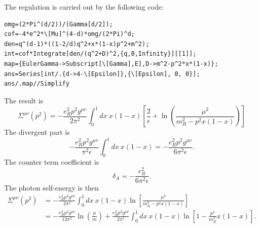 The regulation is carried out by the following code:
\begin{lstlisting}[style=mathematicaFrameTB]
omg=(2*Pi^(d/2))/(Gamma[d/2]);
cof=-4*e^2*\[Mu]^(4-d)*omg/(2*Pi)^d;
den=q^(d-1)*((1-2/d)q^2+x*(1-x)p^2+m^2);
int=cof*Integrate[den/(q^2+D)^2,{q,0,Infinity}][[1]];
map={EulerGamma->Subscript[\[Gamma],E],D->m^2-p^2*x*(1-x)};
ans=Series[int/.{d->4-\[Epsilon]},{\[Epsilon], 0, 0}];
ans/.map//Simplify
\end{lstlisting}
The result is
\begin{equation}
	\Sigma^{\mu\nu}(p^2) 
	= -\frac{e_R^2 p^2 g^{\mu\nu}}{2\pi^2} \int_0^1 dx\ x(1-x)
	\left[\frac{2}{\epsilon}+\ln\left(\frac{\mu^2}{m_R^2-p^2 x(1-x)}\right)\right]
\end{equation}
The divergent part is
\begin{equation*}
	-\frac{e_R^2 p^2 g^{\mu\nu}}{\pi^2 \epsilon} \int_0^1 dx\ x(1-x)
	= -\frac{e_R^2 p^2 g^{\mu\nu}}{6\pi^2 \epsilon}.
\end{equation*}
The counter term coefficient is
\begin{equation}
	\delta_A = -\frac{e_R^2}{6\pi^2 \epsilon}.
\end{equation}
The photon self-energy is then
\begin{equation}
\begin{aligned}
	\Sigma^{\mu\nu}(p^2) 
	&= -\frac{e_R^2 p^2 g^{\mu\nu}}{2\pi^2} \int_0^1 dx\ x(1-x)
	\ln\left[\frac{\mu^2}{m_R^2-p^2 x(1-x)}\right] \\
	&= -\frac{e_R^2 p^2 g^{\mu\nu}}{12\pi^2} \ln\left(\frac{\mu}{m}\right)
	 + \frac{e_R^2 p^2 g^{\mu\nu}}{2\pi^2}\int_0^{1} dx\ x(1-x) \ln\left[1-\frac{p^2}{m_R^2}x(1-x)\right].
\end{aligned}
\end{equation}



